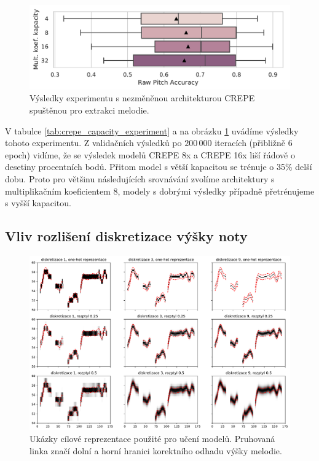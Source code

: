 \begin{figure}[h]\centering
    \includegraphics[scale=0.6]{../img/figures/crepe_kapacita.pdf}
\caption{Výsledky experimentu s nezměněnou architekturou CREPE spuštěnou pro extrakci melodie.}
\label{obr:crepe_capacity_experiment}
\end{figure}

V tabulce \ref{tab:crepe_capacity_experiment} a na obrázku \ref{obr:crepe_capacity_experiment} uvádíme výsledky tohoto experimentu. Z validačních výsledků po $200\,000$ iteracích (přibližně 6 epoch) vidíme, že se výsledek modelů CREPE 8x a CREPE 16x liší řádově o desetiny procentních bodů. Přitom model s větší kapacitou se trénuje o 35\% delší dobu. Proto pro většinu následujících srovnávání zvolíme architektury s multiplikačním koeficientem 8, modely s dobrými výsledky případně přetrénujeme s vyšší kapacitou.

\subsection{Vliv rozlišení diskretizace výšky noty}\label{sec:crepe_diskretizace}

\begin{figure}[h]\centering
    \includegraphics[width=\textwidth,height=\textheight,keepaspectratio]{../img/reprezentace_vstupu.pdf}
\caption{Ukázky cílové reprezentace použité pro učení modelů. Pruhovaná linka značí dolní a horní hranici korektního odhadu výšky melodie.}\label{obr:reprezentace_vstupu}
\end{figure}

